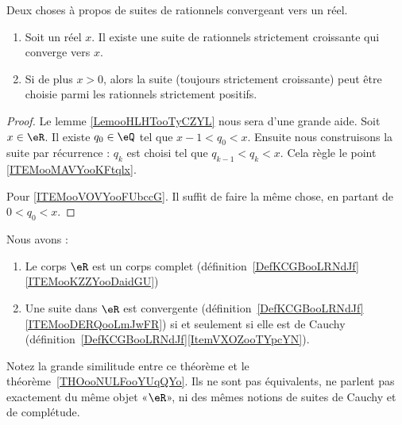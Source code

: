 \begin{proposition}     \label{PROPooFGBOooHiZqbs}
    Deux choses à propos de suites de rationnels convergeant vers un réel.
    \begin{enumerate}
        \item       \label{ITEMooMAVYooKFtqlx}
    Soit un réel \( x\). Il existe une suite de rationnels strictement croissante qui converge vers \( x\).
\item       \label{ITEMooVOVYooFUbccG}
    Si de plus \( x>0\), alors la suite (toujours strictement croissante) peut être choisie parmi les rationnels strictement positifs.
    \end{enumerate}
\end{proposition}

\begin{proof}
    Le lemme \ref{LemooHLHTooTyCZYL} nous sera d'une grande aide. Soit \( x\in \eR\). Il existe \( q_0\in \eQ\) tel que \( x-1<q_0<x\). Ensuite nous construisons la suite par récurrence : \( q_k\) est choisi tel que \( q_{k-1}<q_k<x\). Cela règle le point \ref{ITEMooMAVYooKFtqlx}.

    Pour \ref{ITEMooVOVYooFUbccG}. Il suffit de faire la même chose, en partant de \( 0<q_0<x\).
\end{proof}

\begin{theorem} \label{THOooUFVJooYJlieh}
    Nous avons :
    \begin{enumerate}
        \item
            Le corps \( \eR\) est un corps complet (définition~\ref{DefKCGBooLRNdJf}\ref{ITEMooKZZYooDaidGU})
        \item
            Une suite dans \( \eR\) est convergente (définition~\ref{DefKCGBooLRNdJf}\ref{ITEMooDERQooLmJwFR}) si et seulement si elle est de Cauchy (définition~\ref{DefKCGBooLRNdJf}\ref{ItemVXOZooTYpcYN}).
    \end{enumerate}
\end{theorem}
Notez la grande similitude entre ce théorème et le théorème~\ref{THOooNULFooYUqQYo}. Ils ne sont pas équivalents, ne parlent pas exactement du même objet «\( \eR\)», ni des mêmes notions de suites de Cauchy et de complétude.

